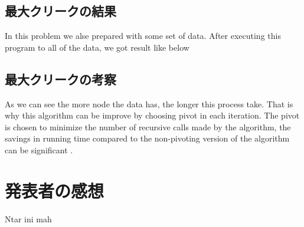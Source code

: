 \documentclass[a4j, titlepage]{jarticle}
\begin{document}
    \subsection{最大クリークの結果}
    In this problem we alse prepared with some set of data. After executing this program to all of the data, we got result like below %
    
    \subsection{最大クリークの考察}
    As we can see the more node the data has, the longer this process take. That is why this algorithm can be improve by choosing pivot in each iteration. The pivot is chosen to minimize the number of recursive calls made by the algorithm, the savings in running time compared to the non-pivoting version of the algorithm can be significant \cite{bib:cazals}. %

\section{発表者の感想}
    Ntar ini mah
    
\end{document}
